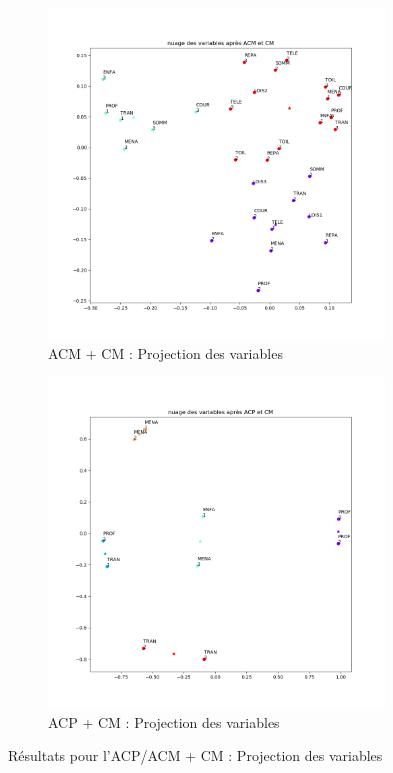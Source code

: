     \begin{figure}[!htb]
        \begin{subfigure}[b]{0.48\textwidth}
            \centering
            \includegraphics[width=0.98\textwidth]{img/Variables_ACM-CM.png}
            \caption{ACM + CM : Projection des variables}
            \label{Label_Variables_ACM-CM.png}
        \end{subfigure}
        \begin{subfigure}[b]{0.48\textwidth}
            \centering
            \includegraphics[width=0.98\textwidth]{img/Variables_ACP-CM.png}
            \caption{ACP + CM : Projection des variables}
            \label{Label_Variables_ACP-CM.png}
        \end{subfigure}
        \caption{Résultats pour l'ACP/ACM + CM : Projection des variables}
        \label{Label_Variables_ACP_ACM-CM.png}
    \end{figure}
    
